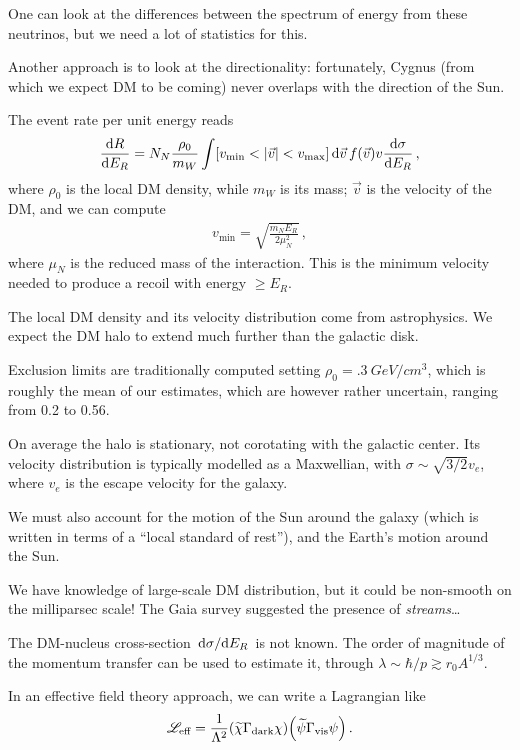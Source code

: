 \documentclass[main.tex]{subfiles}
\begin{document}
One can look at the differences between the spectrum of energy from these neutrinos, but we need a lot of statistics for this. 

Another approach is to look at the directionality:
fortunately, Cygnus (from which we expect DM to be coming) never overlaps with the direction of the Sun. 

The event rate per unit energy reads 
%
\begin{align}
\dv{R}{E_R} = N_N \frac{\rho_0  }{ m_W} \int [v _{\text{min}} < \abs{\vec{v}} < v _{\text{max}}] \dd{\vec{v}} f(\vec{v}) v \dv{\sigma }{E_R}
\,,
\end{align}
%
where \(\rho_0 \) is the local DM density, while \(m_W\) is its mass; \(\vec{v}\) is the velocity of the DM, and we can compute 
%
\begin{align}
v _{\text{min}} = \sqrt{\frac{m_N E_R}{2 \mu^2_N}}
\,,
\end{align}
%
where \(\mu _N\) is the reduced mass of the interaction. 
This is the minimum velocity needed to produce a recoil with energy \(\geq E_R\). 

The local DM density and its velocity distribution come from astrophysics. 
We expect the DM halo to extend much further than the galactic disk. 

Exclusion limits are traditionally computed setting \(\rho_0 = \SI{.3}{GeV / cm^3}\), which is roughly the mean of our estimates, which are however rather uncertain, ranging from \num{.2} to \num{.56}.  

On average the halo is stationary, not corotating with the galactic center. 
Its velocity distribution is typically modelled as a Maxwellian, with \(\sigma \sim \sqrt{3/2} v_e\), where \(v_e\) is the escape velocity for the galaxy. 

We must also account for the motion of the Sun around the  galaxy (which is written in terms of a ``local standard of rest''), and the Earth's motion around the Sun. 

We have knowledge of large-scale DM distribution, but it could be non-smooth on the milliparsec scale! 
The Gaia survey suggested the presence of \emph{streams}\dots

The DM-nucleus cross-section \(\dv*{\sigma }{E_R}\) is not known. 
The order of magnitude of the momentum transfer can be used to estimate it, through \(\lambda \sim \hbar / p \gtrsim r_0 A^{1/3}\).

In an effective field theory approach, we can write a Lagrangian like 
%
\begin{align}
\mathscr{L} _{\text{eff}} = \frac{1}{\Lambda^2} \qty( \widetilde{\chi} \Gamma _{\text{dark}} \chi ) \qty( \widetilde{\psi} \Gamma _{\text{vis}} \psi )
\,.
\end{align}
\end{document}
